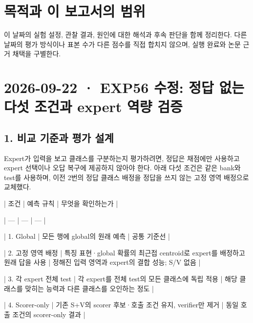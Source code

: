 




\section*{목적과 이 보고서의 범위}

이 날짜의 실험 설정, 관찰 결과, 원인에 대한 해석과 후속 판단을 함께 정리한다. 다른 날짜의 평가 방식이나 표본 수가 다른 점수를 직접 합치지 않으며, 실행 완료와 논문 근거 채택을 구별한다.


\section{2026-09-22 · EXP56 수정: 정답 없는 다섯 조건과 expert 역량 검증}
\label{report:20260922_exp56_five_condition_results}
\subsection{1. 비교 기준과 평가 설계}
Expert가 입력을 보고 클래스를 구분하는지 평가하려면, 정답은 채점에만 사용하고 expert 선택이나 오답 복구에 제공하지 않아야 한다. 아래 다섯 조건은 같은 bank와 test를 사용하며, 이전 2번의 정답 클래스 배정을 정답을 쓰지 않는 고정 영역 배정으로 교체했다.

| 조건 | 예측 규칙 | 무엇을 확인하는가 |

| --- | --- | --- |

| 1. Global | 모든 행에 global의 원래 예측 | 공통 기준선 |

| 2. 고정 영역 배정 | 특징 표현·global 확률의 최근접 centroid로 expert를 배정하고 원래 답을 사용 | 정해진 입력 영역과 expert의 결합 성능; S/\allowbreak{}V 없음 |

| 3. 각 expert 전체 test | 각 expert를 전체 test의 모든 클래스에 독립 적용 | 해당 클래스를 맞히는 능력과 다른 클래스를 오인하는 정도 |

| 4. Scorer-only | 기존 S+\allowbreak{}V의 scorer 후보·호출 조건 유지, verifier만 제거 | 동일 호출 조건의 scorer-only 결과 |

